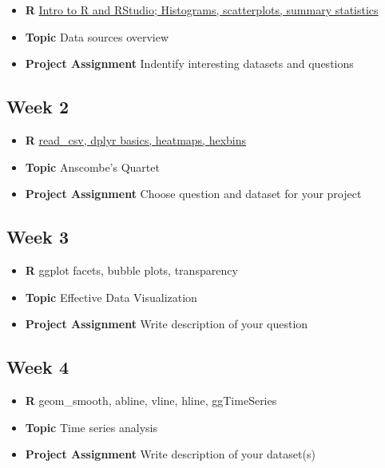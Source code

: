 \documentclass[]{book}
\providecommand{\tightlist}{%
  \setlength{\itemsep}{0pt}\setlength{\parskip}{0pt}}
\begin{document}
\begin{itemize}
\tightlist
\item
  \textbf{R} \protect\hyperlink{intro}{Intro to R and RStudio;
  Histograms, scatterplots, summary statistics}
\item
  \textbf{Topic} Data sources overview
\item
  \textbf{Project Assignment} Indentify interesting datasets and
  questions
\end{itemize}

\subsection*{Week 2}\label{week-2}

\begin{itemize}
\tightlist
\item
  \textbf{R} \protect\hyperlink{read-data}{read\_csv, dplyr basics,
  heatmaps, hexbins}
\item
  \textbf{Topic} Anscombe's Quartet
\item
  \textbf{Project Assignment} Choose question and dataset for your
  project
\end{itemize}

\subsection*{Week 3}\label{week-3}

\begin{itemize}
\tightlist
\item
  \textbf{R} ggplot facets, bubble plots, transparency
\item
  \textbf{Topic} Effective Data Visualization
\item
  \textbf{Project Assignment} Write description of your question
\end{itemize}

\subsection*{Week 4}\label{week-4}

\begin{itemize}
\tightlist
\item
  \textbf{R} geom\_smooth, abline, vline, hline, ggTimeSeries
\item
  \textbf{Topic} Time series analysis
\item
  \textbf{Project Assignment} Write description of your dataset(s)
\end{itemize}
\end{document}
